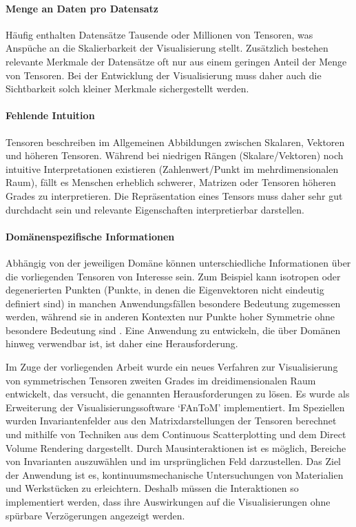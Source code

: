 \documentclass[a4paper,fontsize=12pt,toc=bib,halfparskip]{scrartcl}
\begin{document}
\paragraph{Menge an Daten pro Datensatz}
H\"aufig enthalten Datens\"atze Tausende oder Millionen von Tensoren, was Ansp\"uche an die Skalierbarkeit der Visualisierung stellt. Zus\"atzlich bestehen relevante Merkmale der Datens\"atze oft nur aus einem geringen Anteil der Menge von Tensoren. Bei der Entwicklung der Visualisierung muss daher auch die Sichtbarkeit solch kleiner Merkmale sichergestellt werden.

\paragraph{Fehlende Intuition}
Tensoren beschreiben im Allgemeinen Abbildungen zwischen Skalaren, Vektoren und h\"oheren Tensoren. W\"ahrend bei niedrigen R\"angen (Skalare/Vektoren) noch intuitive Interpretationen existieren (Zahlenwert/Punkt im mehrdimensionalen Raum), f\"allt es Menschen erheblich schwerer, Matrizen oder Tensoren h\"oheren Grades zu interpretieren. Die Repr\"asentation eines Tensors muss daher sehr gut durchdacht sein und relevante Eigenschaften interpretierbar darstellen.

\paragraph{Dom\"anenspezifische Informationen}
Abh\"angig von der jeweiligen Dom\"ane k\"onnen unterschiedliche Informationen \"uber die vorliegenden Tensoren von Interesse sein.  Zum Beispiel kann isotropen oder degenerierten Punkten (Punkte, in denen die Eigenvektoren nicht eindeutig definiert sind) in manchen Anwendungsf\"allen besondere Bedeutung zugemessen werden, w\"ahrend sie in anderen Kontexten nur Punkte hoher Symmetrie ohne besondere Bedeutung sind \cite[S.~4]{hlawitschka2014top}. Eine Anwendung zu entwickeln, die \"uber Dom\"anen hinweg verwendbar ist, ist daher eine Herausforderung.


Im Zuge der vorliegenden Arbeit wurde ein neues Verfahren zur Visualisierung von symmetrischen Tensoren zweiten Grades im dreidimensionalen Raum entwickelt, das versucht, die genannten Herausforderungen zu l\"osen. Es wurde als Erweiterung der Visualisierungssoftware `FAnToM' implementiert. Im Speziellen wurden Invariantenfelder aus den Matrixdarstellungen der Tensoren berechnet und mithilfe von Techniken aus dem Continuous Scatterplotting und dem Direct Volume Rendering dargestellt. Durch Mausinteraktionen ist es m\"oglich, Bereiche von Invarianten auszuw\"ahlen und im urspr\"unglichen Feld darzustellen. Das Ziel der Anwendung ist es, kontinuumsmechanische Untersuchungen von Materialien und Werkst\"ucken zu erleichtern. Deshalb m\"ussen die Interaktionen so implementiert werden, dass ihre Auswirkungen auf die Visualisierungen ohne sp\"urbare Verz\"ogerungen angezeigt werden.
\end{document}
